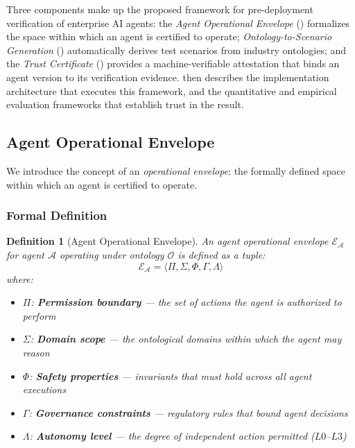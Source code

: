 \documentclass[11pt,a4paper]{article}
\newtheorem{definition}{Definition}[section]
\newcommand{\agent}{\mathcal{A}}
\newcommand{\env}{\mathcal{E}}
\newcommand{\onto}{\mathcal{O}}
\begin{document}
Three components make up the proposed framework for pre-deployment
verification of enterprise AI agents: the \emph{Agent Operational
Envelope} () formalizes the space
within which an agent is certified to operate;
\emph{Ontology-to-Scenario Generation}
() automatically derives test scenarios
from industry ontologies; and the \emph{Trust Certificate}
() provides a machine-verifiable
attestation that binds an agent version to its verification evidence.
 then describes the implementation
architecture that executes this framework, and
 the quantitative and empirical evaluation
frameworks that establish trust in the result.

\subsection{Agent Operational Envelope}
\label{sec:operational-envelope}

We introduce the concept of an \emph{operational envelope}: the
formally defined space within which an agent is certified to operate.

\subsubsection{Formal Definition}

\begin{definition}[Agent Operational Envelope]
  An agent operational envelope $\env_\agent$ for agent $\agent$
  operating under ontology $\onto$ is defined as a tuple:
  \begin{equation}
    \env_\agent = \langle \Pi, \Sigma, \Phi, \Gamma, \Lambda \rangle
  \end{equation}
  where:
  \begin{itemize}
    \item $\Pi$: \textbf{Permission boundary} --- the set of actions
      the agent is authorized to perform
    \item $\Sigma$: \textbf{Domain scope} --- the ontological domains
      within which the agent may reason
    \item $\Phi$: \textbf{Safety properties} --- invariants that must
      hold across all agent executions
    \item $\Gamma$: \textbf{Governance constraints} --- regulatory
      rules that bound agent decisions
    \item $\Lambda$: \textbf{Autonomy level} --- the degree of
      independent action permitted ($L0$--$L3$)
  \end{itemize}
\end{definition}
\end{document}
